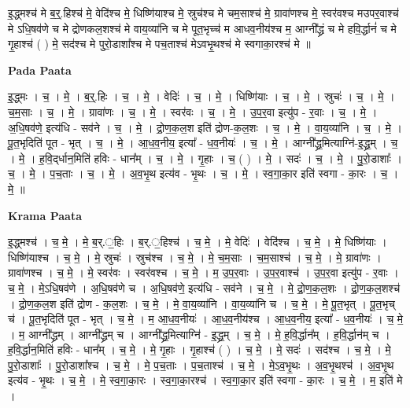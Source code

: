 \documentclass[17pt]{extarticle}
\begin{document}
इ॒द्ध्मश्च॑ मे ब॒र्॒.हिश्च॑ मे॒ वेदि॑श्च मे॒ धिष्णि॑याश्च मे॒ स्रुच॑श्च मे चम॒साश्च॑ मे॒ ग्रावा॑णश्च मे॒ स्वर॑वश्च मउपर॒वाश्च॑ मे ऽधि॒षव॑णे च मे द्रोणकल॒शश्च॑ मे वाय॒व्या॑नि च मे पूत॒भृच्च॑ म आधव॒नीय॑श्च म॒ आग्नी᳚द्ध्रं च मे हवि॒र्द्धानं॑ च मे गृ॒हाश्च॑ ( ) मे॒ सद॑श्च मे पुरो॒डाशा᳚श्च मे पच॒ताश्च॑ मेऽवभृ॒थश्च॑ मे स्वगाका॒रश्च॑ मे ॥ \newline

\textbf{Pada Paata} \newline

इ॒द्ध्मः । च॒ । मे॒ । ब॒र्॒.हिः । च॒ । मे॒ । वेदिः॑ । च॒ । मे॒ । धिष्णि॑याः । च॒ । मे॒ । स्रुचः॑ । च॒ । मे॒ । च॒म॒साः । च॒ । मे॒ । ग्रावा॑णः । च॒ । मे॒ । स्वर॑वः । च॒ । मे॒ । उ॒प॒र॒वा इत्यु॑प - र॒वाः । च॒ । मे॒ । अ॒धि॒षव॑णे॒ इत्य॑धि - सव॑ने । च॒ । मे॒ । द्रो॒ण॒क॒ल॒श इति॑ द्रोण-क॒ल॒शः । च॒ । मे॒ । वा॒य॒व्या॑नि । च॒ । मे॒ । पू॒त॒भृदिति॑ पूत - भृत् । च॒ । मे॒ । आ॒ध॒व॒नीय॒ इत्या᳚ - ध॒व॒नीयः॑ । च॒ । मे॒ । आग्नी᳚द्ध्र॒मित्याग्नि॑-इ॒द्ध्र॒म् । च॒ । मे॒ । ह॒वि॒द्‌र्धान॒मिति॑ हविः - धान᳚म् । च॒ । मे॒ । गृ॒हाः । च॒ ( ) । मे॒ । सदः॑ । च॒ । मे॒ । पु॒रो॒डाशाः᳚ । च॒ । मे॒ । प॒च॒ताः । च॒ । मे॒ । अ॒व॒भृ॒थ इत्य॑व - भृ॒थः । च॒ । मे॒ । स्व॒गा॒का॒र इति॑ स्वगा - का॒रः । च॒ । मे॒ ॥  \newline


\textbf{Krama Paata} \newline

इ॒द्ध्मश्च॑ । च॒ मे॒ । मे॒ ब॒र्.॒हिः । ब॒र्.॒हिश्च॑ । च॒ मे॒ । मे॒ वेदिः॑ । वेदि॑श्च । च॒ मे॒ । मे॒ धिष्णि॑याः । धिष्णि॑याश्च । च॒ मे॒ । मे॒ स्रुचः॑ । स्रुच॑श्च । च॒ मे॒ । मे॒ च॒म॒साः । च॒म॒साश्च॑ । च॒ मे॒ । मे॒ ग्रावा॑णः । ग्रावा॑णश्च । च॒ मे॒ । मे॒ स्वर॑वः । स्वर॑वश्च । च॒ मे॒ । म॒ उ॒प॒र॒वाः । उ॒प॒र॒वाश्च॑ । उ॒प॒र॒वा इत्यु॑प - र॒वाः । च॒ मे॒ । मे॒ऽधि॒षव॑णे । अ॒धि॒षव॑णे च । अ॒धि॒षव॑णे॒ इत्य॑धि - सव॑ने । च॒ मे॒ । मे॒ द्रो॒ण॒क॒ल॒शः । द्रो॒ण॒क॒ल॒शश्च॑ । द्रो॒ण॒क॒ल॒श इति॑ द्रोण - क॒ल॒शः । च॒ मे॒ । मे॒ वा॒य॒व्या॑नि । वा॒य॒व्या॑नि च । च॒ मे॒ । मे॒ पू॒त॒भृत् । पू॒त॒भृच् च॑ । पू॒त॒भृदिति॑ पूत - भृत् । च॒ मे॒ । म॒ आ॒ध॒व॒नीयः॑ । आ॒ध॒व॒नीय॑श्च । आ॒ध॒व॒नीय॒ इत्या᳚ - ध॒व॒नीयः॑ । च॒ मे॒ । म॒ आग्नी᳚द्ध्रम् । आग्नी᳚द्ध्रम् च । आग्नी᳚द्ध्र॒मित्याग्नि॑ - इ॒द्ध्र॒म् । च॒ मे॒ । मे॒ ह॒वि॒र्द्धान᳚म् । ह॒वि॒र्द्धान॑म् च । ह॒वि॒र्द्धान॒मिति॑ हविः - धान᳚म् । च॒ मे॒ । मे॒ गृ॒हाः । गृ॒हाश्च॑ ( ) । च॒ मे॒ । मे॒ सदः॑ । सद॑श्च । च॒ मे॒ । मे॒ पु॒रो॒डाशाः᳚ । पु॒रो॒डाशा᳚श्च । च॒ मे॒ । मे॒ प॒च॒ताः । प॒च॒ताश्च॑ । च॒ मे॒ । मे॒ऽव॒भृ॒थः । अ॒व॒भृ॒थश्च॑ । अ॒व॒भृ॒थ इत्य॑व - भृ॒थः । च॒ मे॒ । मे॒ स्व॒गा॒का॒रः । स्व॒गा॒का॒रश्च॑ । स्व॒गा॒का॒र इति॑ स्वगा - का॒रः । च॒ मे॒ । म॒ इति॑ मे । \newline
\end{document}
